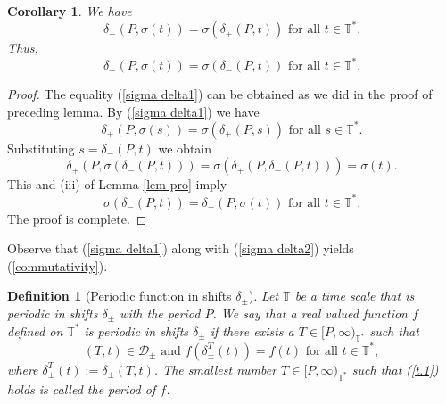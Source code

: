 \documentclass[b5paper,reqno]{amsart}\usepackage{amsfonts}
\theoremstyle{plain}
\newtheorem{corollary}{Corollary}
\newtheorem{definition}{Definition}
\numberwithin{equation}{section}
\begin{document}
\begin{corollary}
\label{Cor 1} We have\begin{equation}
\delta_{+}(P,\sigma(t))=\sigma(\delta_{+}(P,t))\text{ for all }t\in
\mathbb{T}^{\ast}\text{.} \label{sigma delta1}\end{equation}
Thus,\begin{equation}
\delta_{-}(P,\sigma(t))=\sigma(\delta_{-}(P,t))\text{ for all }t\in
\mathbb{T}^{\ast}\text{.} \label{sigma delta2}\end{equation}

\end{corollary}

\begin{proof}
The equality (\ref{sigma delta1}) can be obtained as we did in the proof of
preceding lemma. By (\ref{sigma delta1}) we have\[
\delta_{+}(P,\sigma(s))=\sigma(\delta_{+}(P,s))\text{ for all }s\in
\mathbb{T}^{\ast}\text{.}\]
Substituting $s=\delta_{-}(P,t)$ we obtain\[
\delta_{+}(P,\sigma(\delta_{-}(P,t)))=\sigma(\delta_{+}(P,\delta
_{-}(P,t)))=\sigma(t)\text{.}\]
This and (iii) of Lemma \ref{lem pro} imply\[
\sigma(\delta_{-}(P,t))=\delta_{-}(P,\sigma(t))\text{ for all }t\in
\mathbb{T}^{\ast}.
\]
The proof is complete.
\end{proof}

Observe that (\ref{sigma delta1}) along with (\ref{sigma delta2}) yields
(\ref{commutativity}).

\begin{definition}
[Periodic function in shifts $\delta_{\pm}$]\label{def periodic in shift}Let
$\mathbb{T}$ be a time scale that is periodic in shifts $\delta_{\pm}$ with
the period $P$. We say that a real valued function $f$ defined on
$\mathbb{T}^{\ast}$ is\emph{ periodic in shifts }$\delta_{\pm}$ if there
exists a $T\in\lbrack P,\infty)_{\mathbb{T}^{\ast}}$ such that
\begin{equation}
\left(  T,t\right)  \in\mathcal{D}_{\pm}\text{ and }f(\delta_{\pm}^{T}(t))=f(t)\text{ for all }t\in\mathbb{T}^{\ast}, \label{t.1}\end{equation}
where $\delta_{\pm}^{T}(t):=\delta_{\pm}(T,t)$. The smallest number
$T\in\lbrack P,\infty)_{\mathbb{T}^{\ast}}$ such that (\ref{t.1}) holds is
called the period of $f$.
\end{definition}
\end{document}
